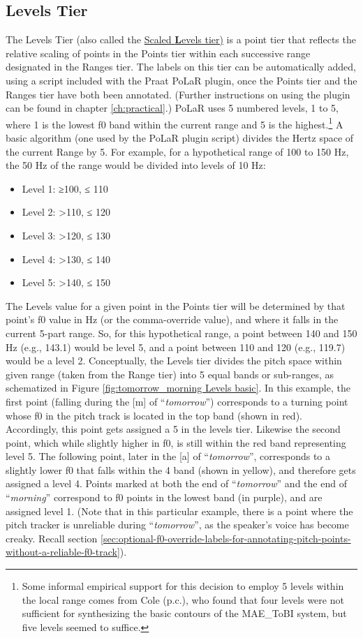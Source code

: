 \documentclass[11pt, twoside]{memoir}
\def\langtext#1{\textit{#1}}
\begin{document}
{{\subsection{Levels Tier}\label{sec:levels}
The Levels Tier (also called the \uline{Scaled \textbf{L}evels tier)} is a point tier that reflects the relative scaling of points in the Points tier within each successive range designated in the Ranges tier. The labels on this tier can be automatically added, using a script included with the Praat PoLaR plugin, once the Points tier and the Ranges tier have both been annotated. (Further instructions on using the plugin can be found in chapter \ref{ch:practical}.)
PoLaR uses 5 numbered levels, 1 to 5, where 1 is the lowest f0 band within the current range and 5 is the highest.\footnote{Some informal empirical support for this decision to employ 5 levels within the local range comes from Cole (p.c.), who found that four levels were not sufficient for synthesizing the basic contours of the MAE\_ToBI system, but five levels seemed to suffice.} A basic algorithm (one used by the PoLaR plugin script) divides the Hertz space of the current Range by 5. For example, for a hypothetical range of 100 to 150 Hz, the 50 Hz of the range would be divided into levels of 10 Hz:
\begin{itemize}
\item Level 1: ≥100, ≤ 110
\item Level 2: >110, ≤ 120
\item Level 3: >120, ≤ 130
\item Level 4: >130, ≤ 140
\item Level 5: >140, ≤ 150 \end{itemize}
The Levels value for a given point in the Points tier will be determined by that point’s f0 value in Hz (or the comma-override value), and where it falls in the current 5-part range. So, for this hypothetical range, a point between 140 and 150 Hz (e.g., 143.1) would be level 5, and a point between 110 and 120 (e.g., 119.7) would be a level 2.
Conceptually, the Levels tier divides the pitch space within given range (taken from the Range tier) into 5 equal bands or sub-ranges, as schematized in Figure \ref{fig:tomorrow_morning Levels basic}. In this example, the first point (falling during the [m] of “\langtext{tomorrow}”) corresponds to a turning point whose f0 in the pitch track is located in the top band (shown in red). Accordingly, this point gets assigned a 5 in the levels tier. Likewise the second point, which while slightly higher in f0, is still within the red band representing level 5. The following point, later in the [a] of “\langtext{tomorrow}”, corresponds to a slightly lower f0 that falls within the 4 band (shown in yellow), and therefore gets assigned a level 4. Points marked at both the end of “\langtext{tomorrow}” and the end of “\langtext{morning}” correspond to f0 points in the lowest band (in purple), and are assigned level 1. (Note that in this particular example, there is a point where the pitch tracker is unreliable during “\langtext{tomorrow}”, as the speaker’s voice has become creaky. Recall section \ref{sec:optional-f0-override-labels-for-annotating-pitch-points-without-a-reliable-f0-track}).
}}
\end{document}
